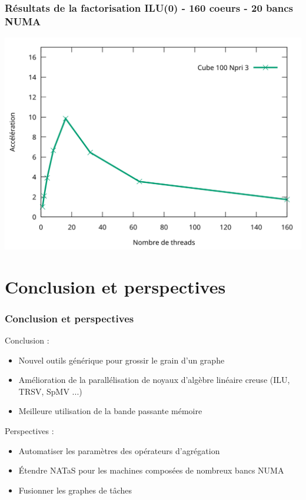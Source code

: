 \documentclass{beamer}
\begin{document}
\begin{frame}
  \frametitle{Résultats de la factorisation ILU(0) - 160 coeurs - 20 bancs NUMA}

  \centerline{\includegraphics[width=0.8\linewidth]{manumanu}}

\end{frame}


\section{Conclusion et perspectives}
\begin{frame}
  \frametitle{Conclusion et perspectives}
         Conclusion :
    \begin{itemize}
      \item<1-> Nouvel outils générique pour grossir le grain d'un graphe
      \item<1-> Amélioration de la parallélisation de noyaux d'algèbre linéaire creuse (ILU, TRSV, SpMV ...)
      \item<1-> Meilleure utilisation de la bande passante mémoire
    \end{itemize}
    \pause

         \bigskip
         \bigskip

    Perspectives :
    \begin{itemize}
      \item<2-> Automatiser les paramètres des opérateurs d'agrégation
      \item<2-> \'Etendre NATaS pour les machines composées de nombreux bancs NUMA
      \item<2-> Fusionner les graphes de tâches
    \end{itemize}
\end{frame}
\end{document}
